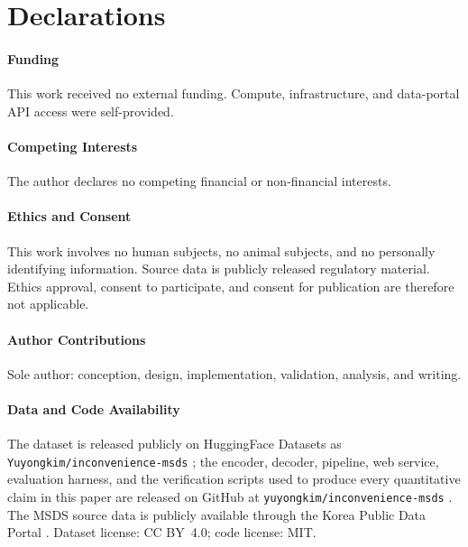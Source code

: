 \documentclass[smallextended]{svjour3}
\begin{document}
\section*{Declarations}

\paragraph{Funding}
This work received no external funding. Compute, infrastructure, and data-portal API access were self-provided.

\paragraph{Competing Interests}
The author declares no competing financial or non-financial interests.

\paragraph{Ethics and Consent}
This work involves no human subjects, no animal subjects, and no personally identifying information. Source data is publicly released regulatory material. Ethics approval, consent to participate, and consent for publication are therefore not applicable.

\paragraph{Author Contributions}
Sole author: conception, design, implementation, validation, analysis, and writing.

\paragraph{Data and Code Availability}
The dataset is released publicly on HuggingFace Datasets as \texttt{Yuyongkim/inconvenience-msds} \cite{hf_dataset}; the encoder, decoder, pipeline, web service, evaluation harness, and the verification scripts used to produce every quantitative claim in this paper are released on GitHub at \texttt{yuyongkim/inconvenience-msds} \cite{github_repo}. The MSDS source data is publicly available through the Korea Public Data Portal \cite{data_go_kr}. Dataset license: CC BY~4.0; code license: MIT.



\end{document}

